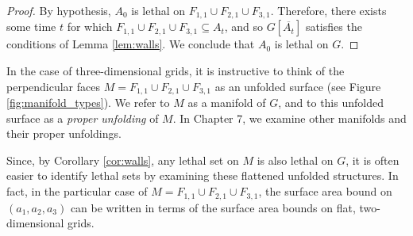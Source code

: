 \begin{proof}
By hypothesis, $A_0$ is lethal on $F_{1,1} \cup F_{2,1} \cup F_{3,1}$. Therefore, there exists some time $t$ for which $F_{1,1} \cup F_{2,1} \cup F_{3,1} \subseteq A_t$, and so $G[\overline{A_t}]$ satisfies the conditions of Lemma \ref{lem:walls}. We conclude that $A_0$ is lethal on $G$.
\end{proof}

In the case of three-dimensional grids, it is instructive to think of the perpendicular faces $M = F_{1,1} \cup F_{2,1} \cup F_{3,1}$ as an unfolded surface (see Figure \ref{fig:manifold_types}). We refer to $M$ as a manifold of $G$, and to this unfolded surface as a \emph{proper unfolding} of $M$. In Chapter 7, we examine other manifolds and their proper unfoldings. 

Since, by Corollary \ref{cor:walls}, any lethal set on $M$ is also lethal on $G$, it is often easier to identify lethal sets by examining these flattened unfolded structures. In fact, in the particular case of $M = F_{1,1} \cup F_{2,1} \cup F_{3,1}$, the surface area bound on $(a_1,a_2,a_3)$ can be written in terms of the surface area bounds on flat, two-dimensional grids.

